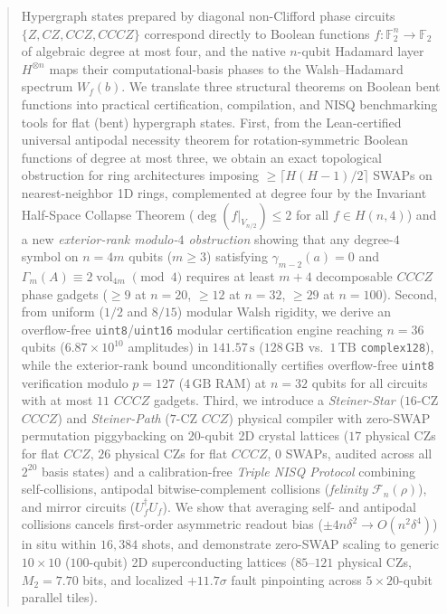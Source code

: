 \documentclass[11pt,a4paper]{article}
\newcommand{\F}{\mathbb{F}}
\begin{document}
\begin{abstract}
Hypergraph states prepared by diagonal non-Clifford phase circuits $\{Z, CZ, CCZ, CCCZ\}$ correspond directly to Boolean functions $f:\F_2^n\to\F_2$ of algebraic degree at most four, and the native $n$-qubit Hadamard layer $H^{\otimes n}$ maps their computational-basis phases to the Walsh--Hadamard spectrum $W_f(b)$. We translate three structural theorems on Boolean bent functions into practical certification, compilation, and NISQ benchmarking tools for flat (bent) hypergraph states. First, from the Lean-certified universal antipodal necessity theorem for rotation-symmetric Boolean functions of degree at most three, we obtain an exact topological obstruction for ring architectures imposing $\ge \lceil H(H-1)/2 \rceil$ SWAPs on nearest-neighbor 1D rings, complemented at degree four by the Invariant Half-Space Collapse Theorem ($\deg(f|_{V_{n/2}})\le 2$ for all $f\in H(n,4)$) and a new \emph{exterior-rank modulo-$4$ obstruction} showing that any degree-$4$ symbol on $n=4m$ qubits ($m\ge 3$) satisfying $\gamma_{m-2}(a)=0$ and $\Gamma_m(A)\equiv 2\operatorname{vol}_{4m}\pmod 4$ requires at least $m+4$ decomposable $CCCZ$ phase gadgets ($\ge 9$ at $n=20$, $\ge 12$ at $n=32$, $\ge 29$ at $n=100$). Second, from uniform ($1/2$ and $8/15$) modular Walsh rigidity, we derive an overflow-free \texttt{uint8}/\texttt{uint16} modular certification engine reaching $n=36$ qubits ($6.87\times 10^{10}$ amplitudes) in $141.57\,\text{s}$ ($128\,\text{GB}$ vs.\ $1\,\text{TB}$ \texttt{complex128}), while the exterior-rank bound unconditionally certifies overflow-free \texttt{uint8} verification modulo $p=127$ ($4\,\text{GB}$ RAM) at $n=32$ qubits for all circuits with at most $11$ $CCCZ$ gadgets. Third, we introduce a \emph{Steiner-Star} ($16$-CZ $CCCZ$) and \emph{Steiner-Path} ($7$-CZ $CCZ$) physical compiler with zero-SWAP permutation piggybacking on $20$-qubit 2D crystal lattices ($17$ physical CZs for flat $CCZ$, $26$ physical CZs for flat $CCCZ$, $0$ SWAPs, audited across all $2^{20}$ basis states) and a calibration-free \emph{Triple NISQ Protocol} combining self-collisions, antipodal bitwise-complement collisions (\emph{felinity} $\mathcal{F}_n(\rho)$), and mirror circuits ($U_f^\dagger U_f$). We show that averaging self- and antipodal collisions cancels first-order asymmetric readout bias ($\pm 4n\delta^2 \to O(n^2\delta^4)$) in situ within $16{,}384$ shots, and demonstrate zero-SWAP scaling to generic $10\times 10$ ($100$-qubit) 2D superconducting lattices ($85$--$121$ physical CZs, $M_2=7.70$ bits, and localized $+11.7\sigma$ fault pinpointing across $5\times 20$-qubit parallel tiles).
\end{abstract}
\end{document}
